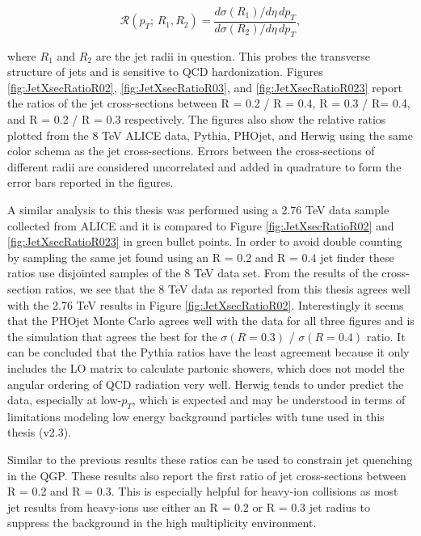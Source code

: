 \begin{equation}
\mathscr{R} (p_{T}; \, R_{1},R_{2}) = \frac{d\sigma(R_{1}) /d\eta \, dp_{T} }{d\sigma (R_{2}) /d\eta \, dp_{T}},
\label{eq:jetxsecratio}
\end{equation}

\noindent
where $R_{1}$ and $R_{2}$ are the jet radii in question. This probes the transverse structure of jets and is sensitive to QCD hardonization\cite{SOYEZ201159}.  Figures \ref{fig:JetXsecRatioR02}, \ref{fig:JetXsecRatioR03}, and \ref{fig:JetXsecRatioR023} report the ratios of the jet cross-sections between R = 0.2 / R = 0.4, R = 0.3 / R= 0.4, and R = 0.2 / R = 0.3 respectively.  The figures also show the relative ratios plotted from the 8 TeV ALICE data, Pythia, PHOjet, and Herwig using the same color schema as the jet cross-sections.  Errors between the cross-sections of different radii are considered uncorrelated and added in quadrature to form the error bars reported in the figures.

A similar analysis to this thesis was performed using a 2.76 TeV  data sample collected from ALICE\cite{MA2013319} and it is compared to Figure \ref{fig:JetXsecRatioR02} and \ref{fig:JetXsecRatioR023} in green bullet points.  In order to avoid double counting by sampling the same jet  found using an R = 0.2 and R = 0.4 jet finder these ratios use disjointed samples of the 8 TeV data set.  From the results of the cross-section ratios, we see that the 8 TeV data as reported from this thesis agrees well with the 2.76 TeV results in Figure \ref{fig:JetXsecRatioR02}.  Interestingly it seems that the PHOjet Monte Carlo agrees well with the data for all three figures and is the simulation that agrees the best for the $\sigma (R = 0.3)$ / $\sigma (R = 0.4)$ ratio.  It can be concluded that the Pythia ratios have the least agreement because it only includes the LO matrix to calculate partonic showers, which does not model the angular ordering of QCD radiation very well.  Herwig tends to under predict the data, especially at low-$p_{T}$, which is expected and may be understood in terms of limitations modeling low energy background particles with tune used in this thesis (v2.3).  

Similar to the previous results these ratios can be used to constrain jet quenching in the QGP.  These results also report the first ratio of jet cross-sections between R = 0.2 and R = 0.3.  This is especially helpful for heavy-ion collisions as most jet results from heavy-ions use either an R = 0.2 or R = 0.3 jet radius to suppress the background in the high multiplicity environment.


